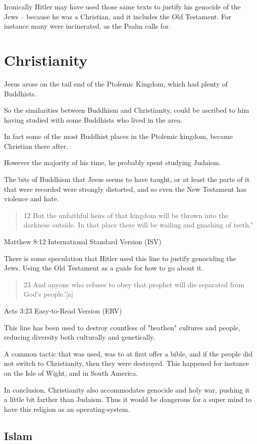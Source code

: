 Ironically Hitler may have used those same texts to justify his genocide of the
Jews -- because he was a Christian, and it includes the Old Testament. For
instance many were incinerated, as the Psalm calls for. 

\chapter{Christianity}
Jesus arose on the tail end of the Ptolemic Kingdom, 
which had plenty of Buddhists.  

So the similarities between Buddhism and Christianity,
could be ascribed to him having studied with some Buddhists who lived in the
area. 

In fact some of the most Buddhist places in the Ptolemic kingdom,
 became Christian there after. 

However the majority of his time, he probably spent studying Judaism.

The bits of Buddhism that Jesus seems to have taught, or at least the
parts of it that were recorded were strongly distorted, and so even the New
Testament has violence and hate.

\blockquote{12 But the unfaithful heirs of that kingdom will be thrown into
the darkness outside. In that place there will be wailing and gnashing of
teeth.”
} {Matthew 8:12 International Standard Version (ISV)}

There is some speculation that Hitler used this line to justify genociding
the Jews. Using the Old Testament as a guide for how to go about it.

\blockquote{23 And anyone who refuses to obey that prophet will die separated
from God’s people.’[a] }{Acts 3:23 Easy-to-Read Version (ERV)}

This line has been used to destroy countless of "heathen" cultures and people,
 reducing diversity both culturally and genetically. 

A common tactic that was used, was to at first offer a bible, and if the people
did not switch to Christianity, then they were destroyed.  This happened for 
instance on the Isle of Wight, and in South America.

In conclusion, Christianity also accommodates genocide and holy war,  pushing it
a little bit farther than Judaism. Thus it would be dangerous for a super mind
to have this religion as an operating-system. 

\section{Islam}
